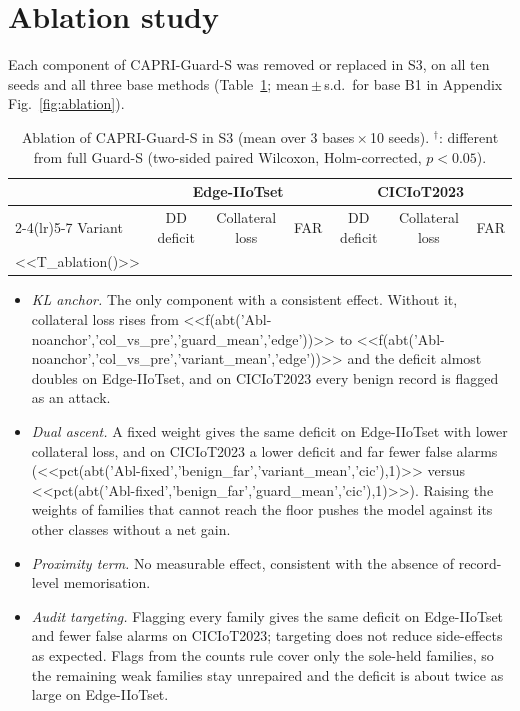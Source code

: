 \documentclass[pdflatex,sn-mathphys-num,iicol]{sn-jnl}
\begin{document}
\section{Ablation study}\label{sec:ablation}

Each component of CAPRI-Guard-S was removed or replaced in S3, on all ten seeds and all three base methods (Table~\ref{tab:ablation}; mean\,$\pm$\,s.d.\ for base B1 in Appendix Fig.~\ref{fig:ablation}).

\begin{table}[t]
\caption{Ablation of CAPRI-Guard-S in S3 (mean over 3 bases\,$\times$\,10 seeds). $^{\dagger}$: different from full Guard-S (two-sided paired Wilcoxon, Holm-corrected, $p<0.05$).}\label{tab:ablation}
\scriptsize
\setlength{\tabcolsep}{3pt}
\begin{tabular*}{\textwidth}{@{\extracolsep\fill}lcccccc}
\toprule
 & \multicolumn{3}{c}{Edge-IIoTset} & \multicolumn{3}{c}{CICIoT2023} \\
\cmidrule(lr){2-4}\cmidrule(lr){5-7}
Variant & DD deficit & Collateral loss & FAR & DD deficit & Collateral loss & FAR \\
\midrule
<<T_ablation()>>
\botrule
\end{tabular*}
\end{table}

\begin{itemize}
\item \emph{KL anchor.} The only component with a consistent effect. Without it, collateral loss rises from <<f(abt('Abl-noanchor','col_vs_pre','guard_mean','edge'))>> to <<f(abt('Abl-noanchor','col_vs_pre','variant_mean','edge'))>> and the deficit almost doubles on Edge-IIoTset, and on CICIoT2023 every benign record is flagged as an attack.
\item \emph{Dual ascent.} A fixed weight gives the same deficit on Edge-IIoTset with lower collateral loss, and on CICIoT2023 a lower deficit and far fewer false alarms (<<pct(abt('Abl-fixed','benign_far','variant_mean','cic'),1)>> versus <<pct(abt('Abl-fixed','benign_far','guard_mean','cic'),1)>>). Raising the weights of families that cannot reach the floor pushes the model against its other classes without a net gain.
\item \emph{Proximity term.} No measurable effect, consistent with the absence of record-level memorisation.
\item \emph{Audit targeting.} Flagging every family gives the same deficit on Edge-IIoTset and fewer false alarms on CICIoT2023; targeting does not reduce side-effects as expected. Flags from the counts rule cover only the sole-held families, so the remaining weak families stay unrepaired and the deficit is about twice as large on Edge-IIoTset.
\end{itemize}
\end{document}

